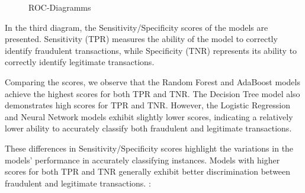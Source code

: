 \documentclass[a4, 10 pt, conference]{ieeeconf}  %
\begin{document}
{ 
\begin{figure}[h]
\centering
  \caption{ROC-Diagramms} 
  \end{figure}
  \begin{itemize}
  \textbfIn In the third diagram, the Sensitivity/Specificity scores of the models are presented. Sensitivity (TPR) measures the ability of the model to correctly identify fraudulent transactions, while Specificity (TNR) represents its ability to correctly identify legitimate transactions.

Comparing the scores, we observe that the Random Forest and AdaBoost models achieve the highest scores for both TPR and TNR. The Decision Tree model also demonstrates high scores for TPR and TNR. However, the Logistic Regression and Neural Network models exhibit slightly lower scores, indicating a relatively lower ability to accurately classify both fraudulent and legitimate transactions.

These differences in Sensitivity/Specificity scores highlight the variations in the models' performance in accurately classifying instances. Models with higher scores for both TPR and TNR generally exhibit better discrimination between fraudulent and legitimate transactions. :
\end{itemize}



}
\end{document}
